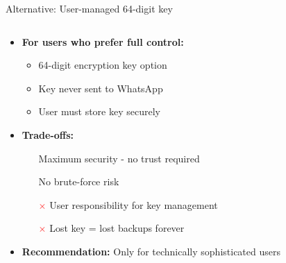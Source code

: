 \documentclass[aspectratio=169, lualatex, handout]{beamer}
\begin{document}
\begin{frame}{Alternative: User-managed 64-digit key}
	\begin{columns}[c]
		\begin{column}{1\textwidth}
			\begin{itemize}
				\item \textbf{For users who prefer full control:}
				      \begin{itemize}
					      \item 64-digit encryption key option
					      \item Key never sent to WhatsApp
					      \item User must store key securely
				      \end{itemize}
				\item \textbf{Trade-offs:}
				      \begin{itemize}
					      \item[\textcolor{green}{\mycheckmark}] Maximum security - no trust required
					      \item[\textcolor{green}{\mycheckmark}] No brute-force risk
					      \item[\textcolor{red}{$\times$}] User responsibility for key management
					      \item[\textcolor{red}{$\times$}] Lost key = lost backups forever
				      \end{itemize}
				\item \textbf{Recommendation:} Only for technically sophisticated users
			\end{itemize}
		\end{column}
	\end{columns}
\end{frame}
\end{document}
